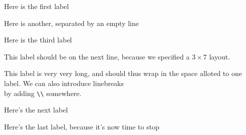 \documentclass[10pt]{article}
\begin{document}
\begin{labels}
Here is the first label

Here is another, separated by an empty line

Here is the third label

This label should be on the next line, because we specified a \(3\times7\) layout.

This label is very very long, and should thus wrap in the space alloted to one label. We can also introduce linebreaks \\ by adding \verb+\\+ somewhere.

Here's the next label

Here's the last label, because it's now time to stop
\end{labels}
\end{document}
